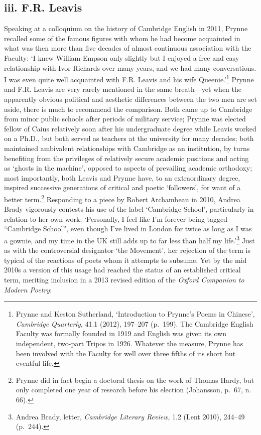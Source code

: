 \documentclass[]{article}
\begin{document}
\subsection{iii. F.R. Leavis}\label{iii.-f.r.-leavis}

Speaking at a colloquium on the history of Cambridge English in 2011,
Prynne recalled some of the famous figures with whom he had become
acquainted in what was then more than five decades of almost continuous
association with the Faculty: ‘I knew William Empson only slightly but I
enjoyed a free and easy relationship with Ivor Richards over many years,
and we had many conversations. I was even quite well acquainted with
F.R. Leavis and his wife Queenie.’\footnote{Prynne and Keston
  Sutherland, ‘Introduction to Prynne’s Poems in Chinese’,
  \emph{Cambridge Quarterly}, 41.1 (2012), 197–207 (p.~199). The
  Cambridge English Faculty was formally founded in 1919 and English was
  given its own independent, two-part Tripos in 1926. Whatever the
  measure, Prynne has been involved with the Faculty for well over three
  fifths of its short but eventful life.} Prynne and F.R. Leavis are
very rarely mentioned in the same breath—yet when the apparently obvious
political and aesthetic differences between the two men are set aside,
there is much to recommend the comparison. Both came up to Cambridge
from minor public schools after periods of military service; Prynne was
elected fellow of Caius relatively soon after his undergraduate degree
while Leavis worked on a Ph.D., but both served as teachers at the
university for many decades; both maintained ambivalent relationships
with Cambridge as an institution, by turns benefiting from the
privileges of relatively secure academic positions and acting as ‘ghosts
in the machine’, opposed to aspects of prevailing academic orthodoxy;
most importantly, both Leavis and Prynne have, to an extraordinary
degree, inspired successive generations of critical and poetic
‘followers’, for want of a better term.\footnote{Prynne did in fact
  begin a doctoral thesis on the work of Thomas Hardy, but only
  completed one year of research before his election (Johansson, p.~67,
  n. 66).} Responding to a piece by Robert Archambeau in 2010, Andrea
Brady vigorously contests his use of the label ‘Cambridge School’,
particularly in relation to her own work: ‘Personally, I feel like I’m
forever being tagged “Cambridge School”, even though I’ve lived in
London for twice as long as I was a gownie, and my time in the UK still
adds up to far less than half my life.’\footnote{Andrea Brady, letter,
  \emph{Cambridge Literary Review}, 1.2 (Lent 2010), 244–49 (p.~244).}
Just as with the controversial designator ‘the Movement’, her rejection
of the term is typical of the reactions of poets whom it attempts to
subsume. Yet by the mid 2010s a version of this usage had reached the
status of an established critical term, meriting inclusion in a 2013
revised edition of the \emph{Oxford Companion to Modern Poetry}:
\end{document}
